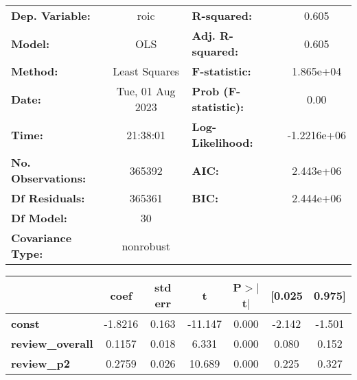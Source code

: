 \begin{center}
\begin{tabular}{lclc}
\toprule
\textbf{Dep. Variable:}                                               &       roic       & \textbf{  R-squared:         } &      0.605   \\
\textbf{Model:}                                                       &       OLS        & \textbf{  Adj. R-squared:    } &      0.605   \\
\textbf{Method:}                                                      &  Least Squares   & \textbf{  F-statistic:       } &  1.865e+04   \\
\textbf{Date:}                                                        & Tue, 01 Aug 2023 & \textbf{  Prob (F-statistic):} &      0.00    \\
\textbf{Time:}                                                        &     21:38:01     & \textbf{  Log-Likelihood:    } & -1.2216e+06  \\
\textbf{No. Observations:}                                            &      365392      & \textbf{  AIC:               } &  2.443e+06   \\
\textbf{Df Residuals:}                                                &      365361      & \textbf{  BIC:               } &  2.444e+06   \\
\textbf{Df Model:}                                                    &          30      & \textbf{                     } &              \\
\textbf{Covariance Type:}                                             &    nonrobust     & \textbf{                     } &              \\
\bottomrule
\end{tabular}
\begin{tabular}{lcccccc}
                                                                      & \textbf{coef} & \textbf{std err} & \textbf{t} & \textbf{P$> |$t$|$} & \textbf{[0.025} & \textbf{0.975]}  \\
\midrule
\textbf{const}                                                        &      -1.8216  &        0.163     &   -11.147  &         0.000        &       -2.142    &       -1.501     \\
\textbf{review\_overall}                                              &       0.1157  &        0.018     &     6.331  &         0.000        &        0.080    &        0.152     \\
\textbf{review\_p2}                                                   &       0.2759  &        0.026     &    10.689  &         0.000        &        0.225    &        0.327     \\

\end{tabular}
\end{center}
